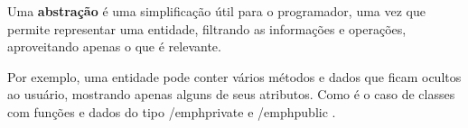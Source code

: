Uma \textbf{abstração} é uma simplificação útil para o programador, uma vez que
permite representar uma entidade, filtrando as informações e operações,
aproveitando apenas o que é relevante.

Por exemplo, uma entidade pode conter vários métodos e dados que ficam ocultos
ao usuário, mostrando apenas alguns de seus atributos. Como é o caso de classes
com funções e dados do tipo /emph{private} e /emph{public} .

